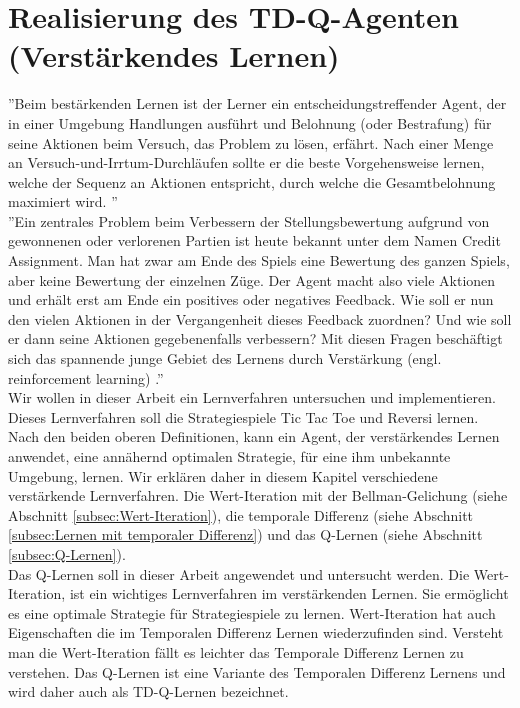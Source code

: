 \chapter{Realisierung des TD-Q-Agenten (Verstärkendes Lernen)}
\label{cha:Realisierung des TD-Q-Agenten}
''Beim bestärkenden Lernen ist der Lerner ein entscheidungstreffender Agent, der in einer Umgebung Handlungen ausführt und Belohnung (oder Bestrafung) für seine Aktionen beim Versuch, das Problem zu lösen, erfährt. Nach einer Menge an Versuch-und-Irrtum-Durchläufen sollte er die beste Vorgehensweise lernen, welche der Sequenz an Aktionen entspricht, durch welche die Gesamtbelohnung maximiert wird. \cite[397]{Alpaydin}'' \\

''Ein zentrales Problem beim Verbessern der Stellungsbewertung aufgrund von gewonnenen oder verlorenen Partien ist heute bekannt unter dem Namen Credit Assignment. Man hat zwar am Ende des Spiels eine Bewertung des ganzen Spiels, aber keine Bewertung der einzelnen Züge. Der Agent macht also viele Aktionen und erhält erst am Ende ein positives oder negatives Feedback. Wie soll er nun den vielen Aktionen in der Vergangenheit dieses Feedback zuordnen? Und wie soll er dann seine Aktionen gegebenenfalls verbessern? Mit diesen Fragen beschäftigt sich das spannende junge Gebiet des Lernens durch Verstärkung (engl. reinforcement learning) \cite[120]{Ertel}.'' \\

Wir wollen in dieser Arbeit ein Lernverfahren untersuchen und implementieren. Dieses Lernverfahren soll die Strategiespiele Tic Tac Toe und Reversi lernen. Nach den beiden oberen Definitionen, kann ein Agent, der verstärkendes Lernen anwendet, eine annähernd optimalen Strategie, für eine ihm unbekannte Umgebung, lernen. Wir erklären daher in diesem Kapitel verschiedene verstärkende Lernverfahren. Die Wert-Iteration mit der Bellman-Gelichung (siehe Abschnitt \ref{subsec:Wert-Iteration}), die temporale Differenz (siehe Abschnitt \ref{subsec:Lernen mit temporaler Differenz}) und das Q-Lernen (siehe Abschnitt \ref{subsec:Q-Lernen}). \\

Das Q-Lernen soll in dieser Arbeit angewendet und untersucht werden. Die Wert-Iteration, ist ein wichtiges Lernverfahren im verstärkenden Lernen. Sie ermöglicht es eine optimale Strategie für Strategiespiele zu lernen. Wert-Iteration hat auch Eigenschaften die im Temporalen Differenz Lernen wiederzufinden sind. Versteht man die Wert-Iteration fällt es leichter das Temporale Differenz Lernen zu verstehen. Das Q-Lernen ist eine Variante des Temporalen Differenz Lernens und wird daher auch als TD-Q-Lernen bezeichnet. \\

